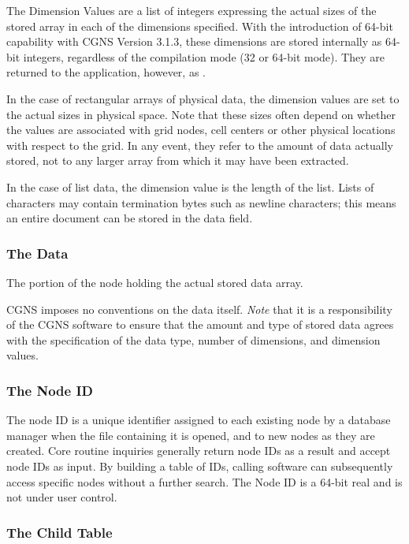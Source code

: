The Dimension Values are a list of integers expressing the actual sizes
of the stored array in each of the dimensions specified. With the
introduction of 64-bit capability with CGNS Version 3.1.3, these
dimensions are stored internally as 64-bit integers, regardless of the
compilation mode (32 or 64-bit mode). They are returned to the
application, however, as .

In the case of rectangular
arrays of physical data, the dimension values are set to the actual
sizes in physical space. Note that these sizes often depend on whether
the values are associated with grid nodes, cell centers or other
physical locations with respect to the grid. In any event, they refer to
the amount of data actually stored, not to any larger array from which
it may have been extracted.

In the case of list data, the dimension value is the length of the
list. Lists of characters may contain termination bytes such as
newline characters; this means an entire document can be
stored in the data field.

\subsubsection{The Data}

The portion of the node holding the actual stored data array.

CGNS imposes no conventions on the data itself.
\textit{Note} that it is a responsibility of the CGNS software to ensure
that the amount and type of stored data agrees with the specification of
the data type, number of dimensions, and dimension values.

\subsubsection{The Node ID}

The node ID is a unique identifier assigned to each existing node by
a database manager when the file containing it is opened, and to new
nodes as they are created. Core routine inquiries generally return node
IDs as a result and accept node IDs as input. By building a table of IDs,
calling software can subsequently access specific nodes without a
further search. The Node ID is a 64-bit real and is not under user control.

\subsubsection{The Child Table}

